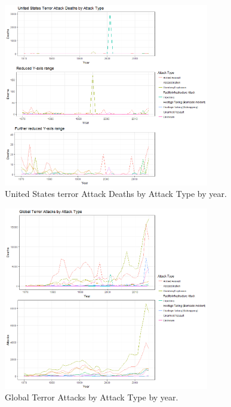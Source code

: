 \documentclass[10pt,a4paper]{article}
\begin{document}
\begin{center}
\begin{figure}[H]
	\includegraphics[width=0.8\textwidth]{Plots/AttackType/Deaths.png}
	\caption{United States terror Attack Deaths by Attack Type by year.}
\end{figure}

\begin{figure}[H]
	\includegraphics[width=0.8\textwidth]{Plots/AttackType/Global.png}
	\caption{Global Terror Attacks by Attack Type by year.}
\end{figure}


\end{center}
\end{document}
